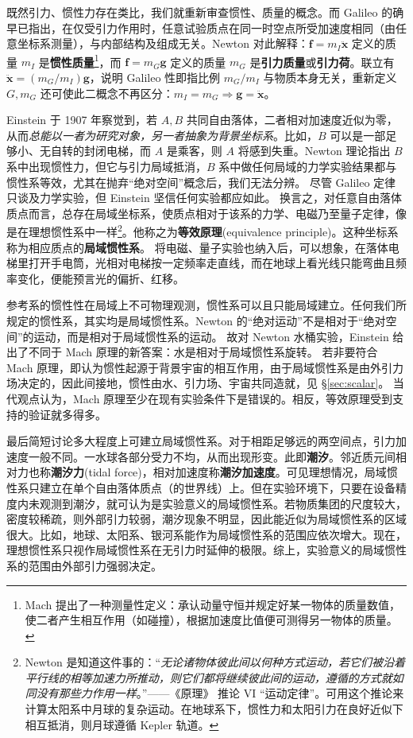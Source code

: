 既然引力、惯性力存在类比，我们就重新审查惯性、质量的概念。而 Galileo 的确早已指出，在仅受引力作用时，任意试验质点在同一时空点所受加速度相同（由任意坐标系测量），与内部结构及组成无关。Newton 对此解释：$\bm f=m_I\ddot{\bm x}$ 定义的质量 $m_I$ 是\textbf{惯性质量}\footnote{Mach 提出了一种测量性定义：承认动量守恒并规定好某一物体的质量数值，使二者产生相互作用（如碰撞），根据加速度比值便可测得另一物体的质量。}，而 $\bm f=m_G\bm g $ 定义的质量 $m_G$ 是\textbf{引力质量}或\textbf{引力荷}。联立有 $\ddot{\bm x}=(m_G/m_I)\bm g $，说明 Galileo 性即指比例 $m_G/m_I$ 与物质本身无关，重新定义 $G,m_G$ 还可使此二概念不再区分：$m_I=m_G\Rightarrow\bm g =\ddot{\bm x}$。

Einstein 于 1907 年察觉到，若 $A,B$ 共同自由落体，二者相对加速度近似为零，从而\emph{总能以一者为研究对象，另一者抽象为背景坐标系}。比如，$B$ 可以是一部足够小、无自转的封闭电梯，而 $A$ 是乘客，则 $A$ 将感到失重。Newton 理论指出 $B$ 系中出现惯性力，但它与引力局域抵消，$B$ 系中做任何局域的力学实验结果都与惯性系等效，尤其在抛弃“绝对空间”概念后，我们无法分辨。
尽管 Galileo 定律只谈及力学实验，但 Einstein 坚信任何实验都应如此。
换言之，对任意自由落体质点而言，总存在局域坐标系，使质点相对于该系的力学、电磁乃至量子定律，像是在理想惯性系中一样\footnote{Newton 是知道这件事的：“\emph{无论诸物体彼此间以何种方式运动，若它们被沿着平行线的相等加速力所推动，则它们都将继续彼此间的运动，遵循的方式就如同没有那些力作用一样}。”——《原理》\cite{Principia} 推论 VI “运动定律”。可用这个推论来计算太阳系中月球的复杂运动。在地球系下，惯性力和太阳引力在良好近似下相互抵消，则月球遵循 Kepler 轨道。}。他称之为\textbf{等效原理}(equivalence principle)。这种坐标系称为相应质点的\textbf{局域惯性系}。
将电磁、量子实验也纳入后，可以想象，在落体电梯里打开手电筒，光相对电梯按一定频率走直线，而在地球上看光线只能弯曲且频率变化，便能预言光的偏折、红移。

参考系的惯性性在局域上不可物理观测，惯性系可以且只能局域建立。任何我们所规定的惯性系，其实均是局域惯性系。Newton 的“绝对运动”不是相对于“绝对空间”的运动，而是相对于局域惯性系的运动。
故对 Newton 水桶实验，Einstein 给出了不同于 Mach 原理的新答案：水是相对于局域惯性系旋转。
若非要符合 Mach 原理，即认为惯性起源于背景宇宙的相互作用，由于局域惯性系是由外引力场决定的，因此间接地，惯性由水、引力场、宇宙共同造就，见 \S\ref{sec:scalar}。
当代观点认为，Mach 原理至少在现有实验条件下是错误的。相反，等效原理受到支持的验证就多得多。

最后简短讨论多大程度上可建立局域惯性系。对于相距足够远的两空间点，引力加速度一般不同。一水球各部分受力不均，从而出现形变。此即\textbf{潮汐}。邻近质元间相对力也称\textbf{潮汐力}(tidal force)，相对加速度称\textbf{潮汐加速度}。可见理想情况，局域惯性系只建立在单个自由落体质点（的世界线）上。但在实验环境下，只要在设备精度内未观测到潮汐，就可认为是实验意义的局域惯性系。若物质集团的尺度较大，密度较稀疏，则外部引力较弱，潮汐现象不明显，因此能近似为局域惯性系的区域很大。比如，地球、太阳系、银河系能作为局域惯性系的范围应依次增大。现在，理想惯性系只视作局域惯性系在无引力时延伸的极限。综上，实验意义的局域惯性系的范围由外部引力强弱决定。


